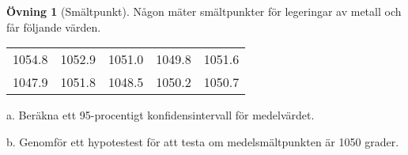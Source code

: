 \documentclass[
]{book}
\theoremstyle{definition}
\theoremstyle{definition}
\theoremstyle{definition}
\newtheorem{exercise}{Övning}[chapter]
\theoremstyle{definition}
\theoremstyle{remark}
\begin{document}
\begin{exercise}[Smältpunkt]
Någon mäter smältpunkter för legeringar av metall och får följande värden.

\begin{table}
\centering
\begin{tabular}[t]{rrrrr}
\toprule
1054.8 & 1052.9 & 1051.0 & 1049.8 & 1051.6\\
1047.9 & 1051.8 & 1048.5 & 1050.2 & 1050.7\\
\bottomrule
\end{tabular}
\end{table}

a. Beräkna ett 95-procentigt konfidensintervall för medelvärdet.

b. Genomför ett hypotestest för att testa om medelsmältpunkten är 1050 grader.
\end{exercise}
\end{document}
